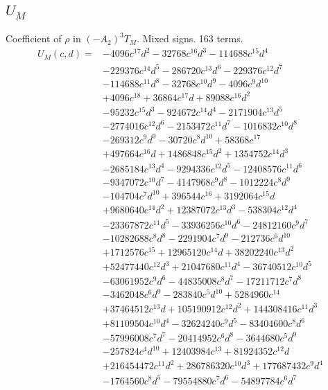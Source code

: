 \subsection*{$U_M$}
Coefficient of $\rho$ in $(-A_2)^3T_M$. Mixed signs. 163 terms.
{\small
\begin{align*}
U_M(c,d)={}&-4096c^{17}d^{2}-32768c^{16}d^{3}-114688c^{15}d^{4}\\
&-229376c^{14}d^{5}-286720c^{13}d^{6}-229376c^{12}d^{7}\\
&-114688c^{11}d^{8}-32768c^{10}d^{9}-4096c^{9}d^{10}\\
&+4096c^{18}+36864c^{17}d+89088c^{16}d^{2}\\
&-95232c^{15}d^{3}-924672c^{14}d^{4}-2171904c^{13}d^{5}\\
&-2774016c^{12}d^{6}-2153472c^{11}d^{7}-1016832c^{10}d^{8}\\
&-269312c^{9}d^{9}-30720c^{8}d^{10}+58368c^{17}\\
&+497664c^{16}d+1486848c^{15}d^{2}+1354752c^{14}d^{3}\\
&-2685184c^{13}d^{4}-9294336c^{12}d^{5}-12408576c^{11}d^{6}\\
&-9347072c^{10}d^{7}-4147968c^{9}d^{8}-1012224c^{8}d^{9}\\
&-104704c^{7}d^{10}+396544c^{16}+3192064c^{15}d\\
&+9680640c^{14}d^{2}+12387072c^{13}d^{3}-538304c^{12}d^{4}\\
&-23367872c^{11}d^{5}-33936256c^{10}d^{6}-24812160c^{9}d^{7}\\
&-10282688c^{8}d^{8}-2291904c^{7}d^{9}-212736c^{6}d^{10}\\
&+1712576c^{15}+12965120c^{14}d+38202240c^{13}d^{2}\\
&+52477440c^{12}d^{3}+21047680c^{11}d^{4}-36740512c^{10}d^{5}\\
&-63061952c^{9}d^{6}-44835008c^{8}d^{7}-17211712c^{7}d^{8}\\
&-3462048c^{6}d^{9}-283840c^{5}d^{10}+5284960c^{14}\\
&+37464512c^{13}d+105190912c^{12}d^{2}+144308416c^{11}d^{3}\\
&+81109504c^{10}d^{4}-32624240c^{9}d^{5}-83404600c^{8}d^{6}\\
&-57996008c^{7}d^{7}-20414952c^{6}d^{8}-3644680c^{5}d^{9}\\
&-257824c^{4}d^{10}+12403984c^{13}+81924352c^{12}d\\
&+216454472c^{11}d^{2}+286786320c^{10}d^{3}+177687432c^{9}d^{4}\\
&-1764560c^{8}d^{5}-79554880c^{7}d^{6}-54897784c^{6}d^{7}\\

\end{align*}}
